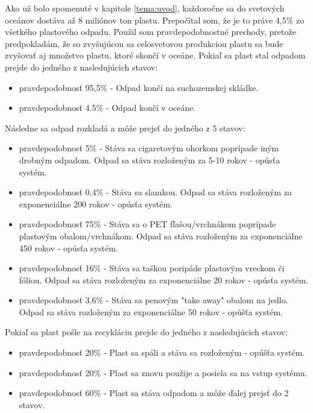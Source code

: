 \documentclass[a4paper, 11pt]{article}
\begin{document}
\noindent
Ako už bolo spomenuté v kapitole \ref{tema:uvod}, každoročne sa do svetových oceánov dostáva až 8 miliónov ton plastu. Prepočítal som, že je to práve 4,5\% zo všetkého plastového odpadu. Použil som pravdepodobnostné prechody, pretože predpokladám, že so zvyšujúcou sa celosvetovou produkciou plastu sa bude zvyšovať aj množstvo plastu, ktoré skončí v oceáne. Pokiaľ sa plast stal odpadom prejde do jedného z nasledujúcich stavov:

\begin{itemize}
	\item pravdepodobnosť 95,5\% - Odpad končí na suchozemskej skládke.
	\item pravdepodobnosť 4.5\% - Odpad končí v oceáne.
\end{itemize}

\noindent
Následne sa odpad rozkladá a môže prejsť do jedného z 5 stavov:

\begin{itemize}
	\item pravdepodobnosť 5\% - Stáva sa cigaretovým ohorkom poprípade iným drobným odpadom. Odpad sa stáva rozloženým za 5-10 rokov - opúsťa systém.
	\item pravdepodobnosť 0,4\% - Stáva sa slamkou. Odpad sa stáva rozloženým za exponenciálne 200 rokov - opúsťa systém.
	\item pravdepodobnosť 75\% - Stáva sa o PET fľašou/vrchnákom poprípade plastovým obalom/vrchnákom. Odpad sa stáva rozloženým za exponenciálne 450 rokov - opúsťa systém.
	\item pravdepodobnosť 16\% - Stáva sa taškou poripáde plastovým vreckom či fóliou. Odpad sa stáva rozloženým za exponenciálne 20 rokov - opúsťa systém.
	\item pravdepodobnosť 3,6\% - Stáva sa penovým "take away" obalom na jedlo. Odpad sa stáva rozloženým za exponenciálne 50 rokov - opúšťa systém.
\end{itemize}

\noindent
Pokiaľ sa plast pošle na recykláciu prejde do jedného z nasledujúcich stavov:

\begin{itemize}
	\item pravdepodobnosť 20\% - Plast sa spáli a stáva sa rozloženým - opúšťa systém.
	\item pravdepodobnosť 20\% - Plast sa znovu použije a posiela sa na vstup systému.
	\item pravdepodobnosť 60\% - Plast sa stáva odpadom a môže ďalej prejsť do 2 stavov.
\end{itemize}
\end{document}

